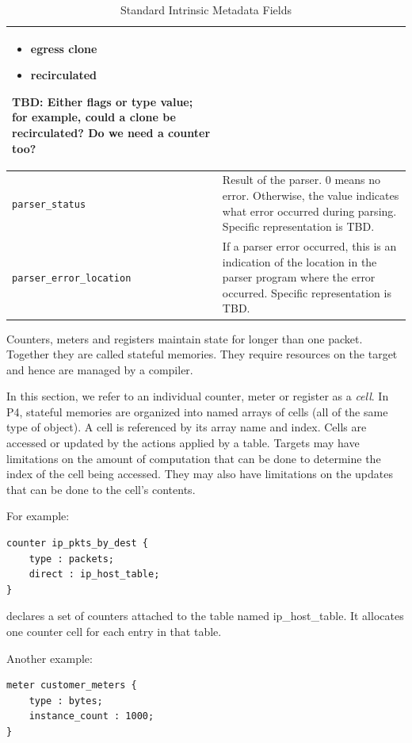 \documentclass[12pt]{article}
\begin{document}
\begin{table}[H]
\begin{center}
\begin{tabular}{| l | p{} |}
\begin{itemize}
\item egress clone
\item recirculated
\end{itemize}
TBD: Either flags or type value; for example, could a clone be recirculated? 
Do we need a counter too?  \\ \hline
\texttt{parser_status} &
Result of the parser. 0 means no error. Otherwise, the value indicates what 
error occurred during parsing. Specific representation is TBD. \\ \hline
\texttt{parser_error_location} &
If a parser error occurred, this is an indication of the location in the parser 
program where the error occurred. Specific representation is TBD. \\ \hline
\end{tabular}
\end{center}
\caption{Standard Intrinsic Metadata Fields}
\label{tab:stanmetadata}
\end{table}


Counters, meters and registers maintain state for longer than one packet. 
Together they are called stateful memories. They require resources on the 
target and hence are managed by a compiler.

In this section, we refer to an individual counter, meter or register as a 
\textit{cell}. In P4, stateful memories are organized into named arrays of cells 
(all of the same type of object). A cell is referenced by its array name and 
index. Cells are accessed or updated by the actions applied by a table. Targets 
may have limitations on the amount of computation that can be done to determine 
the index of the cell being accessed.  They may also have limitations on 
the updates that can be done to the cell's contents.

For example:

\begin{lstlisting}[keywords={},frame=single,escapechar=\@]
counter ip_pkts_by_dest {
    type : packets;
    direct : ip_host_table;
}
\end{lstlisting}


declares a set of counters attached to the table named ip_host_table. It 
allocates one counter cell for each entry in that table.

Another example:

\begin{lstlisting}[keywords={},frame=single,escapechar=\@]
meter customer_meters {
    type : bytes;
    instance_count : 1000;
}
\end{lstlisting}
\end{document}
